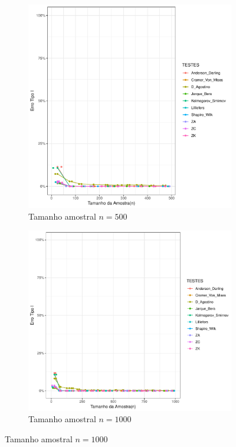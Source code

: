 \documentclass[a4paper,11pt]{article} %
\begin{document}
\begin{figure}[H]
    \vspace{0.5cm} %
    \begin{subfigure}[b]{0.45\textwidth}
        \centering
        \includegraphics[width=\textwidth]{Distribuição Cauchy/Erro Tipo I/erro_tipo_I_cauchy_500.pdf}
        \caption{Tamanho amostral \(n = 500\)}
        \label{fig:cauchy_500}
    \end{subfigure}
    \hfill
    \begin{subfigure}[b]{0.45\textwidth}
        \centering
        \includegraphics[width=\textwidth]{Distribuição Cauchy/Erro Tipo I/erro_tipo_I_cauchy_1000.pdf}
        \caption{Tamanho amostral \(n = 1000\)}
        \label{fig:cauchy_1000}
    \end{subfigure}
\end{figure}
\end{document}
